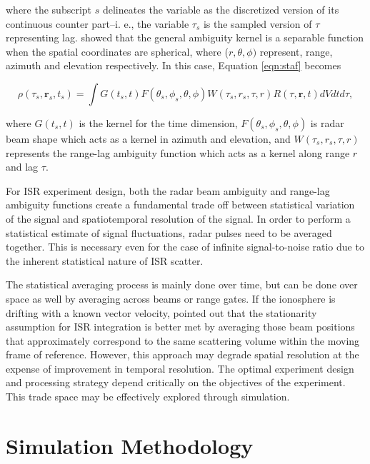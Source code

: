 \documentclass[draft,ras]{agutex}
\begin{document}
\begin{article}
\noindent where the subscript $s$ delineates the variable as the discretized version of its continuous counter part--i. e., the variable $\tau_s$ is the sampled version of $\tau$ representing lag. \citet{RDS:RDS20236} showed that the general ambiguity kernel is a separable function when the spatial coordinates are spherical, where ($r,\theta,\phi)$ represent, range, azimuth and elevation respectively.  In this case, Equation \ref{eqn:staf} becomes

\begin{equation}
\label{eqn:stafbrok}
\rho(\tau_s,\mathbf{r}_s,t_s)= \int G(t_s,t)F(\theta_s,\phi_s,\theta,\phi)W(\tau_s,r_s,\tau,r) R(\tau,\mathbf{r},t) dVdt d\tau,
\end{equation}

\noindent where $G(t_s,t)$ is the kernel for the time dimension, $F(\theta_s,\phi_s,\theta,\phi)$ is radar beam shape which acts as a kernel in azimuth and elevation, and $W(\tau_s,r_s,\tau,r) $ represents the range-lag ambiguity function which acts as a kernel along range $r$ and lag $\tau$. 

For ISR experiment design, both the radar beam ambiguity and range-lag ambiguity functions create a fundamental trade off between statistical variation of the signal and spatiotemporal resolution of the signal. In order to  perform a statistical estimate of signal fluctuations, radar pulses need to be averaged together. This is necessary even for the case of infinite signal-to-noise ratio due to the inherent statistical nature of ISR  scatter.

The statistical averaging process is mainly done over time, but can be done over space as well by averaging across beams or range gates. If the ionosphere is drifting with a known vector velocity, \citet{RDS:RDS20236} pointed out that the stationarity assumption for ISR integration is  better met by averaging those beam positions that approximately correspond to the same scattering volume within the moving frame of reference. However, this approach may degrade spatial resolution at the expense of improvement in temporal resolution.  The optimal experiment design and processing strategy depend critically on the objectives of the experiment.   This trade space may be effectively explored through simulation.

\section{Simulation Methodology}


\end{article}
\end{document}
